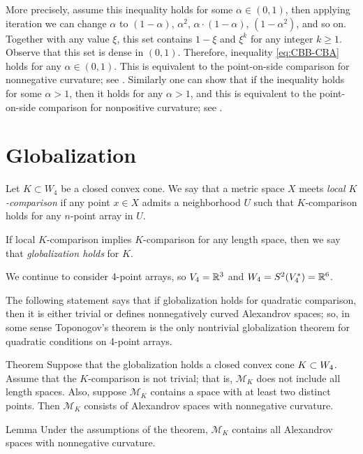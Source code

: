 \documentclass[a4paper,10pt]{article}
\begin{document}
More precisely, assume this inequality holds for some $\alpha\in (0,1)$, then applying iteration we can change $\alpha$ to $(1-\alpha)$, $\alpha^2$,  $\alpha\cdot (1-\alpha)$, $(1-\alpha^2)$, and so on.
Together with any value $\xi$, this set contains $1-\xi$ and $\xi^k$ for any integer $k\ge 1$.
Observe that this set is dense in $(0,1)$.
Therefore, inequality \ref{eq:CBB-CBA} holds for any $\alpha\in (0,1)$.
This is equivalent to the point-on-side comparison for nonnegative curvature; see \cite[8.14]{AKP-2024}.
Similarly one can show that if the inequality holds for some $\alpha>1$, then it holds for any $\alpha>1$,
and this is equivalent to the point-on-side comparison for nonpositive curvature; see \cite[9.14]{AKP-2024}.
\qeds

\section{Globalization}\label{par:globalization}

Let $K\subset W_4$ be a closed convex cone.
We say that a metric space $X$ meets \emph{local $K$-comparison} if any point $x\in X$ admits a neighborhood $U$ such that $K$-comparison holds for any $n$-point array in $U$.

If local $K$-comparison implies $K$-comparison for any length space, then we say that \emph{globalization holds} for $K$.

We continue to consider 4-point arrays, so $V_4=\mathbb{R}^3$ and $W_4=S^2(V_4^*)=\mathbb{R}^6$.

The following statement says that if globalization holds for quadratic comparison, then it is either trivial or defines nonnegatively curved Alexandrov spaces;
so, in some sense Toponogov's theorem is the only nontrivial globalization theorem for quadratic conditions on 4-point arrays.

\begin{thm}{Theorem}\label{thm:globalization}
Suppose that the globalization holds a closed convex cone $K\z\subset W_4$.
Assume that the $K$-comparison is not trivial;
that is, $\mathcal{M}_K$ does not include all length spaces.
Also, suppose $\mathcal{M}_K$ contains a space with at least two distinct points.
Then $\mathcal{M}_K$ consists of Alexandrov spaces with nonnegative curvature.
\end{thm}

\begin{thm}{Lemma}\label{lem:globalization}
Under the assumptions of the theorem, $\mathcal{M}_K$ contains all Alexandrov spaces with nonnegative curvature.
\end{thm}
\end{document}
